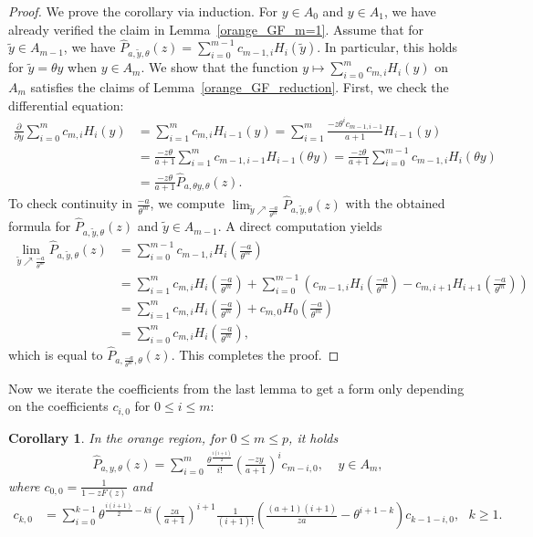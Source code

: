 \documentclass[12pt]{article}
\newcommand{\1}{\mathds{1}}
\theoremstyle{definition}
\theoremstyle{plain}
\newtheorem{Corollary}[definition]{Corollary}
\theoremstyle{remark}
\begin{document}
    \begin{proof}
       We prove the corollary via induction. For $y\in A_0$ and $y\in A_1$, we have already verified the claim in Lemma~\ref{orange_GF_m=1}. 
       Assume that for $\tilde y\in A_{m-1}$, we have $\hat{P}_{a,\tilde y,\theta}(z)=\sum_{i=0}^{m-1}c_{m-1,i}H_i(\tilde y)$. In particular, this holds for $\tilde y=\theta y$ when $y\in A_m$.
       We show that  the function $y\mapsto\sum_{i=0}^mc_{m,i}H_i(y)$ on $A_m$ satisfies the claims of Lemma~\ref{orange_GF_reduction}. First, we check the differential equation:
       \begin{align*}
           \frac{\partial}{\partial y}\sum_{i=0}^mc_{m,i}H_i(y)
           &=\sum_{i=1}^mc_{m,i}H_{i-1}(y)
           =\sum_{i=1}^m\frac{-z\theta^ic_{m-1,i-1}}{a+1}H_{i-1}(y)
          \\&=\frac{-z\theta}{a+1}\sum_{i=1}^mc_{m-1,i-1}H_{i-1}(\theta y)
           =\frac{-z\theta}{a+1}\sum_{i=0}^{m-1}c_{m-1,i}H_{i}(\theta y)
           \\&=\frac{-z\theta}{a+1}\hat{P}_{a,\theta y,\theta}(z).
       \end{align*}
      To check continuity in $\frac{-a}{\theta^m}$, we compute $
          \lim_{\tilde y\nearrow\frac{-a}{\theta^{m}}}\hat{P}_{a,\tilde y,\theta}(z)$ with the obtained formula for $
          \hat{P}_{a,\tilde y,\theta}(z)$ and $\tilde y\in A_{m-1}$. A direct computation yields
          \begin{align*}
              \lim_{\tilde y\nearrow\frac{-a}{\theta^{m}}}\hat{P}_{a,\tilde y,\theta}(z)
              &=\sum_{i=0}^{m-1}c_{m-1,i}H_i\left(\frac{-a}{\theta^m}\right)
              \\&=\sum_{i=1}^mc_{m,i}H_i\left(\frac{-a}{\theta^{m}}\right)+\sum_{i=0}^{m-1}\left(c_{m-1,i}H_i\left(\frac{-a}{\theta^m}\right)-c_{m,i+1}H_{i+1}\left(\frac{-a}{\theta^{m}}\right)\right)
              \\&=\sum_{i=1}^mc_{m,i}H_i\left(\frac{-a}{\theta^{m}}\right)+c_{m,0}H_0\left(\frac{-a}{\theta^{m}}\right)
              \\&=\sum_{i=0}^mc_{m,i}H_i\left(\frac{-a}{\theta^{m}}\right),
          \end{align*}
          which is equal to $ \hat{P}_{a,\frac{-a}{\theta^m},\theta}(z)$. This completes the proof.
    \end{proof}
Now we iterate the coefficients from the last lemma to get a form only depending on the coefficients $c_{i,0}$ for $0\le i\le m$:
\begin{Corollary}\label{orange_GF_iterierte_coeff}
    In the orange region, for $0\le m\le p$, it holds
    \begin{align} \label{eqn:orange:hh}
       \hat{P}_{a,y,\theta}(z)=\sum_{i=0}^m\frac{\theta^\frac{i(i+1)}{2}}{i!}\left(\frac{-zy}{a+1}\right)^ic_{m-i,0},~~~~~y\in A_m,
    \end{align}
    where $c_{0,0}=\frac{1}{1-zF(z)}$ and \begin{align}
            c_{k,0}
            &=\sum_{i=0}^{k-1}\theta^{\frac{i(i+1)}{2}-ki}\left(\frac{za}{a+1}\right)^{i+1}\frac{1}{(i+1)!}\left(\frac{(a+1)(i+1)}{za}-\theta^{i+1-k}\right)c_{k-1-i,0},~~~k\ge 1.\label{orange_sum_c}
        \end{align}
    \end{Corollary}
\end{document}

